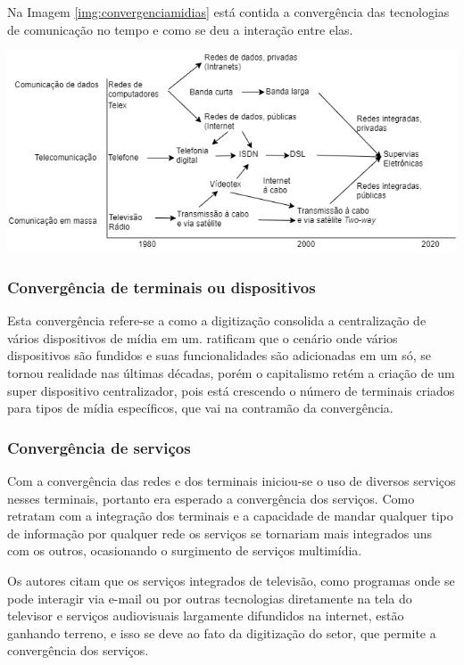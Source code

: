 Na Imagem \ref{img:convergenciamidias} está contida a convergência das tecnologias de comunicação no tempo e como se deu a interação entre elas.

\begin{center}
	\includegraphics[width=.90\linewidth]{figuras/integrationoftransmission.jpg}
	\label{img:convergenciamidias}
\end{center}

\subsubsection{Convergência de terminais ou dispositivos}

Esta convergência refere-se a como a digitização consolida a centralização de vários dispositivos de mídia em um. \cite[p.~2]{storsul2010} ratificam que o cenário onde vários dispositivos são fundidos e suas funcionalidades são adicionadas em um só, se tornou realidade nas últimas décadas, porém o capitalismo retém a criação de um super dispositivo centralizador, pois está crescendo o número de terminais criados para tipos de mídia específicos, que vai na contramão da convergência.

\subsubsection{Convergência de serviços}

Com a convergência das redes e dos terminais iniciou-se o uso de diversos serviços nesses terminais, portanto era esperado a convergência dos serviços. Como retratam \cite{storsul2010} com a integração dos terminais e a capacidade de mandar qualquer tipo de informação por qualquer rede os serviços se tornariam mais integrados uns com os outros, ocasionando o surgimento de serviços multimídia. 

Os autores citam que os serviços integrados de televisão, como programas onde se pode interagir via e-mail ou por outras tecnologias diretamente na tela do televisor e serviços audiovisuais largamente difundidos na internet, estão ganhando terreno, e isso se deve ao fato da digitização do setor, que permite a convergência dos serviços.

